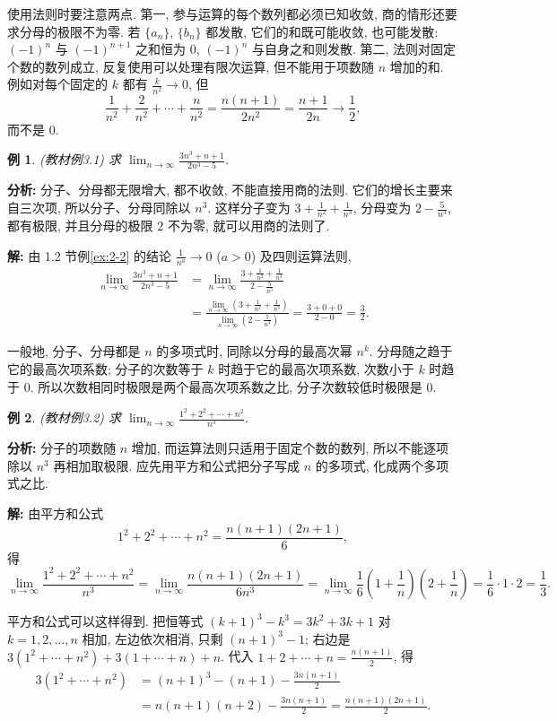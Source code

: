 \documentclass[UTF8,openany]{ctexbook}
\theoremstyle{chinesetextbook}
\newtheorem{example}{例}[section]
\newenvironment{cnsolution}{\par\indent\textbf{解:} \ignorespaces}{\par}
\begin{document}
使用法则时要注意两点. 第一, 参与运算的每个数列都必须已知收敛, 商的情形还要求分母的极限不为零. 若 $\{a_n\}$, $\{b_n\}$ 都发散, 它们的和既可能收敛, 也可能发散: $(-1)^n$ 与 $(-1)^{n+1}$ 之和恒为 $0$, $(-1)^n$ 与自身之和则发散. 第二, 法则对固定个数的数列成立, 反复使用可以处理有限次运算, 但不能用于项数随 $n$ 增加的和. 例如对每个固定的 $k$ 都有 $\displaystyle\frac k{n^2}\to0$, 但
\[
\frac1{n^2}+\frac2{n^2}+\cdots+\frac n{n^2}=\frac{n(n+1)}{2n^2}=\frac{n+1}{2n}\to\frac12,
\]
而不是 $0$.
\begin{example}
\textnormal{(教材例3.1)} 求 $\displaystyle\lim_{n\to\infty}\frac{3n^3+n+1}{2n^3-5}$.
\end{example}
\par\indent\textbf{分析:} 分子、分母都无限增大, 都不收敛, 不能直接用商的法则. 它们的增长主要来自三次项, 所以分子、分母同除以 $n^3$. 这样分子变为 $\displaystyle3+\frac1{n^2}+\frac1{n^3}$, 分母变为 $\displaystyle2-\frac5{n^3}$, 都有极限, 并且分母的极限 $2$ 不为零, 就可以用商的法则了.
\begin{cnsolution}
由 1.2 节例\ref{ex:2-2} 的结论 $\displaystyle\frac1{n^a}\to0$ ($a>0$) 及四则运算法则,
\[
\begin{aligned}
\lim_{n\to\infty}\frac{3n^3+n+1}{2n^3-5}
&=\lim_{n\to\infty}\frac{3+\frac1{n^2}+\frac1{n^3}}{2-\frac5{n^3}}\\
&=\frac{\displaystyle\lim_{n\to\infty}\left(3+\frac1{n^2}+\frac1{n^3}\right)}{\displaystyle\lim_{n\to\infty}\left(2-\frac5{n^3}\right)}
=\frac{3+0+0}{2-0}=\frac32.
\end{aligned}
\]
\end{cnsolution}
一般地, 分子、分母都是 $n$ 的多项式时, 同除以分母的最高次幂 $n^k$. 分母随之趋于它的最高次项系数; 分子的次数等于 $k$ 时趋于它的最高次项系数, 次数小于 $k$ 时趋于 $0$. 所以次数相同时极限是两个最高次项系数之比, 分子次数较低时极限是 $0$.
\begin{example}
\textnormal{(教材例3.2)} 求 $\displaystyle\lim_{n\to\infty}\frac{1^2+2^2+\cdots+n^2}{n^3}$.
\end{example}
\par\indent\textbf{分析:} 分子的项数随 $n$ 增加, 而运算法则只适用于固定个数的数列, 所以不能逐项除以 $n^3$ 再相加取极限. 应先用平方和公式把分子写成 $n$ 的多项式, 化成两个多项式之比.
\begin{cnsolution}
由平方和公式
\[
1^2+2^2+\cdots+n^2=\frac{n(n+1)(2n+1)}6,
\]
得
\[
\lim_{n\to\infty}\frac{1^2+2^2+\cdots+n^2}{n^3}
=\lim_{n\to\infty}\frac{n(n+1)(2n+1)}{6n^3}
=\lim_{n\to\infty}\frac16\left(1+\frac1n\right)\left(2+\frac1n\right)
=\frac16\cdot1\cdot2=\frac13.
\]
\end{cnsolution}
平方和公式可以这样得到. 把恒等式 $(k+1)^3-k^3=3k^2+3k+1$ 对 $k=1,2,\ldots,n$ 相加, 左边依次相消, 只剩 $(n+1)^3-1$; 右边是 $3(1^2+\cdots+n^2)+3(1+\cdots+n)+n$. 代入 $\displaystyle1+2+\cdots+n=\frac{n(n+1)}2$, 得
\[
\begin{aligned}
3(1^2+\cdots+n^2)&=(n+1)^3-(n+1)-\frac{3n(n+1)}2\\
&=n(n+1)(n+2)-\frac{3n(n+1)}2=\frac{n(n+1)(2n+1)}2.
\end{aligned}
\]
\end{document}
